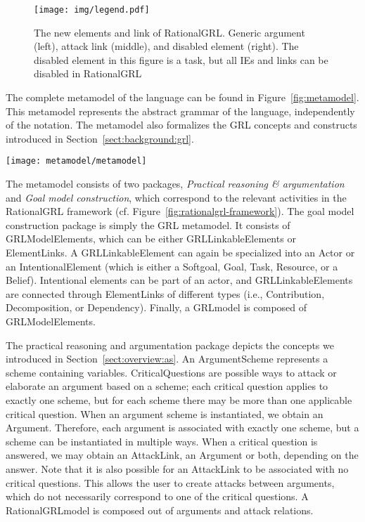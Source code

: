 \begin{figure}[b]
\centering
\texttt{[image: img/legend.pdf]}
\caption{The new elements and link of RationalGRL. Generic argument (left), attack link (middle), and disabled element (right). The disabled element in this figure is a task, but all IEs and links can be disabled in RationalGRL}
\label{fig:rationalgrllegend}
\end{figure}


The complete metamodel of the language can be found in Figure~\ref{fig:metamodel}. This metamodel represents the abstract grammar of the language, independently of the notation. The metamodel also formalizes the GRL concepts and constructs introduced in Section~\ref{sect:background:grl}.

\begin{figure*}[t]
\texttt{[image: metamodel/metamodel]}
\caption{The RationalGRL metamodel. The \emph{Goal model construction} package (bottom) is the GRL metamodel. The \emph{Practical reasoning \& argumentation} package is the RationalGRL extension}
\label{fig:metamodel}
\end{figure*}

The metamodel consists of two packages, \emph{Practical reasoning \& argumentation} and \emph{Goal model construction}, which correspond to the relevant activities in the RationalGRL framework (cf. Figure~\ref{fig:rationalgrl-framework}). The goal model construction package is simply the GRL metamodel. It consists of \textsf{GRLModelElements}, which can be either \textsf{GRLLinkableElements} or \textsf{ElementLinks}. A \textsf{GRLLinkableElement} can again be specialized into an \textsf{Actor} or an \textsf{IntentionalElement} (which is either a \textsf{Softgoal}, \textsf{Goal}, \textsf{Task}, \textsf{Resource}, or a \textsf{Belief}). Intentional elements can be part of an actor, and \textsf{GRLLinkableElements} are connected through \textsf{ElementLinks} of different types (i.e., \textsf{Contribution, Decomposition}, or \textsf{Dependency}). Finally, a \textsf{GRLmodel} is composed of \textsf{GRLModelElements}.

The practical reasoning and argumentation package depicts the concepts we introduced in Section~\ref{sect:overview:as}. An \textsf{ArgumentScheme} represents a scheme containing variables. \textsf{CriticalQuestions} are possible ways to attack or elaborate an argument based on a scheme; each critical question applies to exactly one scheme, but for each scheme there may be more than one applicable critical question. When an argument scheme is instantiated, we obtain an \textsf{Argument}. Therefore, each argument is associated with exactly one scheme, but a scheme can be instantiated in multiple ways. When a critical question is answered, we may obtain an \textsf{AttackLink}, an \textsf{Argument} or both, depending on the answer. Note that it is also possible for an \textsf{AttackLink} to be associated with no critical questions. This allows the user to create attacks between arguments, which do not necessarily correspond to one of the critical questions. A \textsf{RationalGRLmodel} is composed out of arguments and attack relations.

